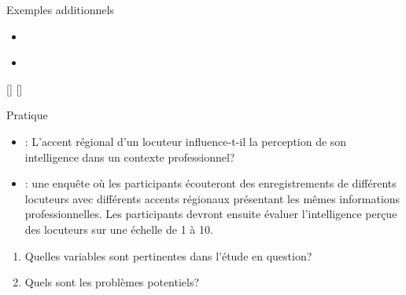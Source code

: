 \documentclass[xcolor=dvipsnames, onlymath, 10pt, aspectratio=169, handout]{beamer}
\begin{document}

\begin{frame}{Exemples additionnels}{}


	\begin{itemize}
		\item[] {\textbf{}}
		\item[]
	\end{itemize}
	\begin{center}
		{} [] \hspace{3em} {} []
	\end{center}


\end{frame}





\begin{frame}{Pratique}
	\begin{itemize}
		\item {} : L'accent régional d'un locuteur influence-t-il la perception de son intelligence dans un contexte professionnel?

		\item {} : une enquête où les participants écouteront des enregistrements de différents locuteurs avec différents accents régionaux présentant les mêmes informations professionnelles. Les participants devront ensuite évaluer l'intelligence perçue des locuteurs sur une échelle de 1 à 10.
	\end{itemize}


	\begin{important}
		\begin{enumerate}
			\item Quelles variables sont pertinentes dans l'étude en question?
			\item Quels sont les problèmes potentiels?
		\end{enumerate}
	\end{important}


\end{frame}



\end{document}
